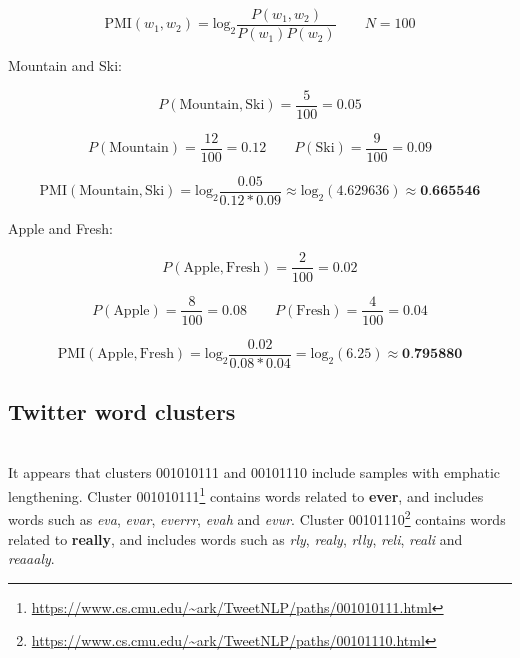 \documentclass[a4paper, 11pt]{article}
\begin{document}
$$\text{PMI}(w_1, w_2) = \text{log}_2 \frac{P(w_1, w_2)}{P(w_1)P(w_2)} \qquad N=100$$

Mountain and Ski:

$$P(\text{Mountain},\text{Ski}) = \frac{5}{100} = 0.05$$

$$P(\text{Mountain}) = \frac{12}{100} = 0.12 \qquad P(\text{Ski}) = \frac{9}{100} = 0.09$$

$$\text{PMI}(\text{Mountain},\text{Ski}) = \text{log}_2 \frac{0.05}{0.12 * 0.09} \approx \text{log}_2(4.629636) \approx \textbf{0.665546}$$

Apple and Fresh:

$$P(\text{Apple},\text{Fresh}) = \frac{2}{100} = 0.02$$

$$P(\text{Apple}) = \frac{8}{100} = 0.08 \qquad P(\text{Fresh}) = \frac{4}{100} = 0.04$$

$$\text{PMI}(\text{Apple},\text{Fresh}) = \text{log}_2 \frac{0.02}{0.08 * 0.04} = \text{log}_2(6.25) \approx \textbf{0.795880}$$


\subsection{Twitter word clusters}

\noindent{}\\

It appears that clusters 001010111 and 00101110 include samples with emphatic lengthening. Cluster 001010111\footnote{\url{https://www.cs.cmu.edu/~ark/TweetNLP/paths/001010111.html}} contains words related to \textbf{ever}, and includes words such as \textit{eva}, \textit{evar}, \textit{everrr}, \textit{evah} and \textit{evur}. Cluster 00101110\footnote{\url{https://www.cs.cmu.edu/~ark/TweetNLP/paths/00101110.html}} contains words related to \textbf{really}, and includes words such as \textit{rly}, \textit{realy}, \textit{rlly}, \textit{reli}, \textit{reali} and \textit{reaaaly}.\\
\end{document}
